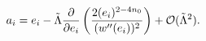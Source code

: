\begin{equation}
a_{i}=e_{i}-\tilde{\Lambda}\frac{\partial }{\partial e_{i}}\left( \frac{%
2(e_{i})^{2-4n_{0}}}{(w^{\prime \prime }(e_{i}))^{2}}\right) +{\cal O}(%
\tilde{\Lambda}^{2}).
\end{equation}


